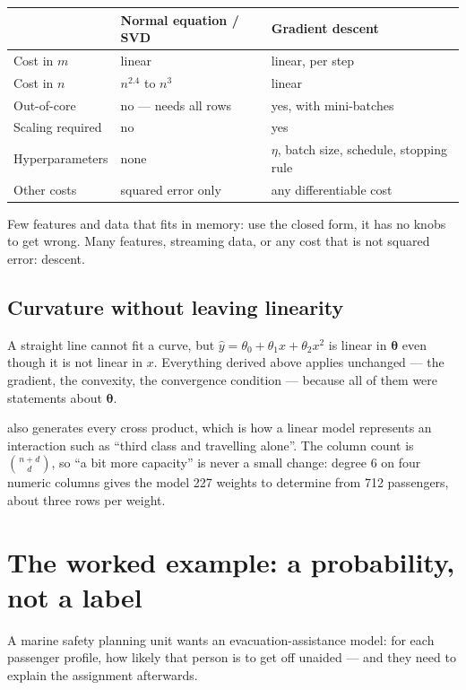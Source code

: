 \documentclass[11pt,a4paper]{article}
\begin{document}
\begin{center}
\small
\begin{tabular}{lll}
\toprule
& \textbf{Normal equation / SVD} & \textbf{Gradient descent} \\
\midrule
Cost in $m$      & linear & linear, per step \\
Cost in $n$      & $n^{2.4}$ to $n^{3}$ & linear \\
Out-of-core      & no --- needs all rows & yes, with mini-batches \\
Scaling required & no & yes \\
Hyperparameters  & none & $\eta$, batch size, schedule, stopping rule \\
Other costs      & squared error only & any differentiable cost \\
\bottomrule
\end{tabular}
\end{center}

Few features and data that fits in memory: use the closed form, it has no knobs
to get wrong. Many features, streaming data, or any cost that is not squared
error: descent.

\subsection{Curvature without leaving linearity}

A straight line cannot fit a curve, but
$\hat y = \theta_0 + \theta_1 x + \theta_2 x^2$ is linear in
$\boldsymbol\theta$ even though it is not linear in $x$. Everything derived
above applies unchanged --- the gradient, the convexity, the convergence
condition --- because all of them were statements about $\boldsymbol\theta$.

 also generates every cross product, which
is how a linear model represents an interaction such as ``third class and
travelling alone''. The column count is $\binom{n+d}{d}$, so ``a bit more
capacity'' is never a small change: degree 6 on four numeric columns gives the
model 227 weights to determine from 712 passengers, about three rows per
weight.

\section{The worked example: a probability, not a label}

A marine safety planning unit wants an evacuation-assistance model: for each
passenger profile, how likely that person is to get off unaided --- and they
need to explain the assignment afterwards.
\end{document}

